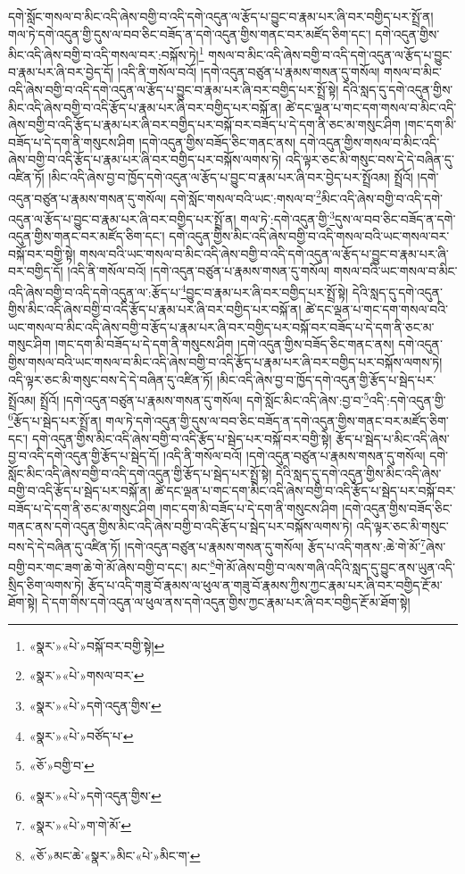 དགེ་སློང་གསལ་བ་མིང་འདི་ཞེས་བགྱི་བ་འདི་དགེ་འདུན་ལ་རྩོད་པ་བྱུང་བ་རྣམ་པར་ཞི་བར་བགྱིད་པར་སྤྲོ་ན། གལ་ཏེ་དགེ་འདུན་གྱི་དུས་ལ་བབ་ཅིང་བཟོད་ན་དགེ་འདུན་གྱིས་གནང་བར་མཛོད་ཅིག་དང་། དགེ་འདུན་གྱིས་མིང་འདི་ཞེས་བགྱི་བ་འདི་གསལ་བར་:བསྐོས་ཏེ།\footnote{«སྣར་»«པེ་»བསྐོ་བར་བགྱི་སྟེ།} གསལ་བ་མིང་འདི་ཞེས་བགྱི་བ་འདི་དགེ་འདུན་ལ་རྩོད་པ་བྱུང་བ་རྣམ་པར་ཞི་བར་བྱེད་དོ། །འདི་ནི་གསོལ་བའོ། །དགེ་འདུན་བཙུན་པ་རྣམས་གསན་དུ་གསོལ། གསལ་བ་མིང་འདི་ཞེས་བགྱི་བ་འདི་དགེ་འདུན་ལ་རྩོད་པ་བྱུང་བ་རྣམ་པར་ཞི་བར་བགྱིད་པར་སྤྲོ་སྟེ། དེའི་སླད་དུ་དགེ་འདུན་གྱིས་མིང་འདི་ཞེས་བགྱི་བ་འདི་རྩོད་པ་རྣམ་པར་ཞི་བར་བགྱིད་པར་བསྐོ་ན། ཚེ་དང་ལྡན་པ་གང་དག་གསལ་བ་མིང་འདི་ཞེས་བགྱི་བ་འདི་རྩོད་པ་རྣམ་པར་ཞི་བར་བགྱིད་པར་བསྐོ་བར་བཟོད་པ་དེ་དག་ནི་ཅང་མ་གསུང་ཤིག །གང་དག་མི་བཟོད་པ་དེ་དག་ནི་གསུངས་ཤིག །དགེ་འདུན་གྱིས་བཟོད་ཅིང་གནང་ནས། དགེ་འདུན་གྱིས་གསལ་བ་མིང་འདི་ཞེས་བགྱི་བ་འདི་རྩོད་པ་རྣམ་པར་ཞི་བར་བགྱིད་པར་བསྐོས་ལགས་ཏེ། འདི་ལྟར་ཅང་མི་གསུང་བས་དེ་དེ་བཞིན་དུ་འཛིན་ཏོ། །མིང་འདི་ཞེས་བྱ་བ་ཁྱོད་དགེ་འདུན་ལ་རྩོད་པ་བྱུང་བ་རྣམ་པར་ཞི་བར་བྱེད་པར་སྤྲོའམ། སྤྲོའོ། །དགེ་འདུན་བཙུན་པ་རྣམས་གསན་དུ་གསོལ། དགེ་སློང་གསལ་བའི་ཡང་:གསལ་བ་\footnote{«སྣར་»«པེ་»གསལ་བར་}མིང་འདི་ཞེས་བགྱི་བ་འདི་དགེ་འདུན་ལ་རྩོད་པ་བྱུང་བ་རྣམ་པར་ཞི་བར་བགྱིད་པར་སྤྲོ་ན། གལ་ཏེ་:དགེ་འདུན་གྱི་\footnote{«སྣར་»«པེ་»དགེ་འདུན་གྱིས་}དུས་ལ་བབ་ཅིང་བཟོད་ན་དགེ་འདུན་གྱིས་གནང་བར་མཛོད་ཅིག་དང་། དགེ་འདུན་གྱིས་མིང་འདི་ཞེས་བགྱི་བ་འདི་གསལ་བའི་ཡང་གསལ་བར་བསྐོ་བར་བགྱི་སྟེ། གསལ་བའི་ཡང་གསལ་བ་མིང་འདི་ཞེས་བགྱི་བ་འདི་དགེ་འདུན་ལ་རྩོད་པ་བྱུང་བ་རྣམ་པར་ཞི་བར་བགྱིད་དོ། །འདི་ནི་གསོལ་བའོ། །དགེ་འདུན་བཙུན་པ་རྣམས་གསན་དུ་གསོལ། གསལ་བའི་ཡང་གསལ་བ་མིང་འདི་ཞེས་བགྱི་བ་འདི་དགེ་འདུན་ལ་:རྩོད་པ་\footnote{«སྣར་»«པེ་»བཙོད་པ་}བྱུང་བ་རྣམ་པར་ཞི་བར་བགྱིད་པར་སྤྲོ་སྟེ། དེའི་སླད་དུ་དགེ་འདུན་གྱིས་མིང་འདི་ཞེས་བགྱི་བ་འདི་རྩོད་པ་རྣམ་པར་ཞི་བར་བགྱིད་པར་བསྐོ་ན། ཚེ་དང་ལྡན་པ་གང་དག་གསལ་བའི་ཡང་གསལ་བ་མིང་འདི་ཞེས་བགྱི་བ་རྩོད་པ་རྣམ་པར་ཞི་བར་བགྱིད་པར་བསྐོ་བར་བཟོད་པ་དེ་དག་ནི་ཅང་མ་གསུང་ཤིག །གང་དག་མི་བཟོད་པ་དེ་དག་ནི་གསུངས་ཤིག །དགེ་འདུན་གྱིས་བཟོད་ཅིང་གནང་ནས། དགེ་འདུན་གྱིས་གསལ་བའི་ཡང་གསལ་བ་མིང་འདི་ཞེས་བགྱི་བ་འདི་རྩོད་པ་རྣམ་པར་ཞི་བར་བགྱིད་པར་བསྐོས་ལགས་ཏེ། འདི་ལྟར་ཅང་མི་གསུང་བས་དེ་དེ་བཞིན་དུ་འཛིན་ཏོ། །མིང་འདི་ཞེས་བྱ་བ་ཁྱོད་དགེ་འདུན་གྱི་རྩོད་པ་སྦེད་པར་སྤྲོའམ། སྤྲོའོ། །དགེ་འདུན་བཙུན་པ་རྣམས་གསན་དུ་གསོལ། དགེ་སློང་མིང་འདི་ཞེས་:བྱ་བ་\footnote{«ཅོ་»བགྱི་བ་}འདི་:དགེ་འདུན་གྱི་\footnote{«སྣར་»«པེ་»དགེ་འདུན་གྱིས་}རྩོད་པ་སྦེད་པར་སྤྲོ་ན། གལ་ཏེ་དགེ་འདུན་གྱི་དུས་ལ་བབ་ཅིང་བཟོད་ན་དགེ་འདུན་གྱིས་གནང་བར་མཛོད་ཅིག་དང་། དགེ་འདུན་གྱིས་མིང་འདི་ཞེས་བགྱི་བ་འདི་རྩོད་པ་སྦེད་པར་བསྐོ་བར་བགྱི་སྟེ། རྩོད་པ་སྦེད་པ་མིང་འདི་ཞེས་བྱ་བ་འདི་དགེ་འདུན་གྱི་རྩོད་པ་སྦེད་དོ། །འདི་ནི་གསོལ་བའོ། །དགེ་འདུན་བཙུན་པ་རྣམས་གསན་དུ་གསོལ། དགེ་སློང་མིང་འདི་ཞེས་བགྱི་བ་འདི་དགེ་འདུན་གྱི་རྩོད་པ་སྦེད་པར་སྤྲོ་སྟེ། དེའི་སླད་དུ་དགེ་འདུན་གྱིས་མིང་འདི་ཞེས་བགྱི་བ་འདི་རྩོད་པ་སྦེད་པར་བསྐོ་ན། ཚེ་དང་ལྡན་པ་གང་དག་མིང་འདི་ཞེས་བགྱི་བ་འདི་རྩོད་པ་སྦེད་པར་བསྐོ་བར་བཟོད་པ་དེ་དག་ནི་ཅང་མ་གསུང་ཤིག །གང་དག་མི་བཟོད་པ་དེ་དག་ནི་གསུངས་ཤིག །དགེ་འདུན་གྱིས་བཟོད་ཅིང་གནང་ནས་དགེ་འདུན་གྱིས་མིང་འདི་ཞེས་བགྱི་བ་འདི་རྩོད་པ་སྦེད་པར་བསྐོས་ལགས་ཏེ། འདི་ལྟར་ཅང་མི་གསུང་བས་དེ་དེ་བཞིན་དུ་འཛིན་ཏོ། །དགེ་འདུན་བཙུན་པ་རྣམས་གསན་དུ་གསོལ། རྩོད་པ་འདི་གནས་:ཆེ་གེ་མོ་\footnote{«སྣར་»«པེ་»ག་གེ་མོ་}ཞེས་བགྱི་བར་གང་ཟག་ཆེ་གེ་མོ་ཞེས་བགྱི་བ་དང་། མང་\footnote{«ཅོ་»མང་ཆེ་«སྣར་»མིང་«པེ་»མིང་ག་}གེ་མོ་ཞེས་བགྱི་བ་ལས་གཞི་འདིའི་སླད་དུ་བྱུང་ནས་ཡུན་འདི་སྲིད་ཅིག་ལགས་ཏེ། རྩོད་པ་འདི་གཟུ་བོ་རྣམས་ལ་ཕུལ་ན་གཟུ་བོ་རྣམས་ཀྱིས་ཀྱང་རྣམ་པར་ཞི་བར་བགྱིད་རྔོ་མ་ཐོག་སྟེ། དེ་དག་གིས་དགེ་འདུན་ལ་ཕུལ་ནས་དགེ་འདུན་གྱིས་ཀྱང་རྣམ་པར་ཞི་བར་བགྱིད་རྔོ་མ་ཐོག་སྟེ། 